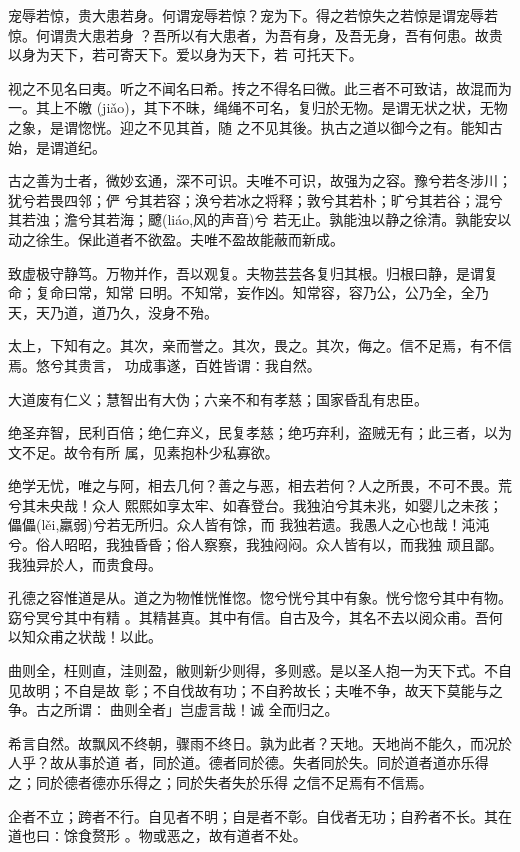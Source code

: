 \documentclass[a4paper, twoside, openany, extrafontsizes]{dlutthesis}
\begin{document}
宠辱若惊，贵大患若身。何谓宠辱若惊？宠为下。得之若惊失之若惊是谓宠辱若惊。何谓贵大患若身
？吾所以有大患者，为吾有身，及吾无身，吾有何患。故贵以身为天下，若可寄天下。爱以身为天下，若
可托天下。

视之不见名曰夷。听之不闻名曰希。抟之不得名曰微。此三者不可致诘，故混而为一。其上不皦
(jiǎo)，其下不昧，绳绳不可名，复归於无物。是谓无状之状，无物之象，是谓惚恍。迎之不见其首，随
之不见其後。执古之道以御今之有。能知古始，是谓道纪。

古之善为士者，微妙玄通，深不可识。夫唯不可识，故强为之容。豫兮若冬涉川；犹兮若畏四邻；俨
兮其若容；涣兮若冰之将释；敦兮其若朴；旷兮其若谷；混兮其若浊；澹兮其若海；飉(liáo,风的声音)兮
若无止。孰能浊以静之徐清。孰能安以动之徐生。保此道者不欲盈。夫唯不盈故能蔽而新成。

致虚极守静笃。万物并作，吾以观复。夫物芸芸各复归其根。归根曰静，是谓复命；复命曰常，知常
曰明。不知常，妄作凶。知常容，容乃公，公乃全，全乃天，天乃道，道乃久，没身不殆。

太上，下知有之。其次，亲而誉之。其次，畏之。其次，侮之。信不足焉，有不信焉。悠兮其贵言，
功成事遂，百姓皆谓∶我自然。

大道废有仁义；慧智出有大伪；六亲不和有孝慈；国家昏乱有忠臣。

绝圣弃智，民利百倍；绝仁弃义，民复孝慈；绝巧弃利，盗贼无有；此三者，以为文不足。故令有所
属，见素抱朴少私寡欲。

绝学无忧，唯之与阿，相去几何？善之与恶，相去若何？人之所畏，不可不畏。荒兮其未央哉！众人
熙熙如享太牢、如春登台。我独泊兮其未兆，如婴儿之未孩；儡儡(lěi,羸弱)兮若无所归。众人皆有馀，而
我独若遗。我愚人之心也哉！沌沌兮。俗人昭昭，我独昏昏；俗人察察，我独闷闷。众人皆有以，而我独
顽且鄙。我独异於人，而贵食母。

孔德之容惟道是从。道之为物惟恍惟惚。惚兮恍兮其中有象。恍兮惚兮其中有物。窈兮冥兮其中有精
。其精甚真。其中有信。自古及今，其名不去以阅众甫。吾何以知众甫之状哉！以此。

曲则全，枉则直，洼则盈，敝则新少则得，多则惑。是以圣人抱一为天下式。不自见故明；不自是故
彰；不自伐故有功；不自矜故长；夫唯不争，故天下莫能与之争。古之所谓∶曲则全者」岂虚言哉！诚
全而归之。

希言自然。故飘风不终朝，骤雨不终日。孰为此者？天地。天地尚不能久，而况於人乎？故从事於道
者，同於道。德者同於德。失者同於失。同於道者道亦乐得之；同於德者德亦乐得之；同於失者失於乐得
之信不足焉有不信焉。

企者不立；跨者不行。自见者不明；自是者不彰。自伐者无功；自矜者不长。其在道也曰∶馀食赘形
。物或恶之，故有道者不处。
\end{document}

